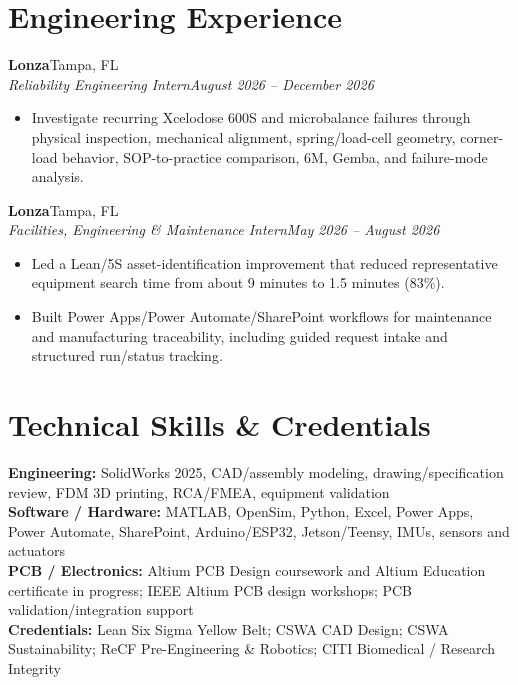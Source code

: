 \documentclass[9pt]{article}
\newcommand{\role}[4]{\textbf{#1}\hfill #2\\\textit{#3}\hfill \textit{#4}\\[-2pt]}
\begin{document}
\section{Engineering Experience}
\role{Lonza}{Tampa, FL}{Reliability Engineering Intern}{August 2026 -- December 2026}
\begin{itemize}
\item Investigate recurring Xcelodose 600S and microbalance failures through physical inspection, mechanical alignment, spring/load-cell geometry, corner-load behavior, SOP-to-practice comparison, 6M, Gemba, and failure-mode analysis.
\end{itemize}
\role{Lonza}{Tampa, FL}{Facilities, Engineering \& Maintenance Intern}{May 2026 -- August 2026}
\begin{itemize}
\item Led a Lean/5S asset-identification improvement that reduced representative equipment search time from about 9 minutes to 1.5 minutes (83\%).
\item Built Power Apps/Power Automate/SharePoint workflows for maintenance and manufacturing traceability, including guided request intake and structured run/status tracking.
\end{itemize}

\section{Technical Skills \& Credentials}
\textbf{Engineering:} SolidWorks 2025, CAD/assembly modeling, drawing/specification review, FDM 3D printing, RCA/FMEA, equipment validation\\
\textbf{Software / Hardware:} MATLAB, OpenSim, Python, Excel, Power Apps, Power Automate, SharePoint, Arduino/ESP32, Jetson/Teensy, IMUs, sensors and actuators\\
\textbf{PCB / Electronics:} Altium PCB Design coursework and Altium Education certificate in progress; IEEE Altium PCB design workshops; PCB validation/integration support\\
\textbf{Credentials:} Lean Six Sigma Yellow Belt; CSWA CAD Design; CSWA Sustainability; ReCF Pre-Engineering \& Robotics; CITI Biomedical / Research Integrity
\end{document}
